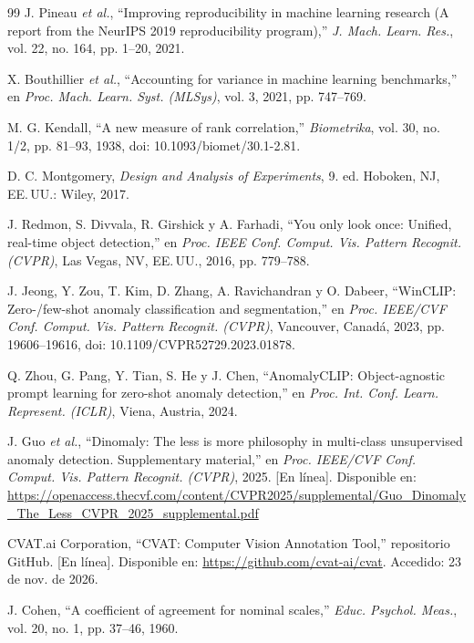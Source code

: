 \documentclass[12pt,oneside]{report}
\begin{document}
\begin{thebibliography}{99}
 J. Pineau \textit{et al.}, ``Improving reproducibility in machine learning research (A report from the NeurIPS 2019 reproducibility program),'' \textit{J. Mach. Learn. Res.}, vol. 22, no. 164, pp. 1--20, 2021.

 X. Bouthillier \textit{et al.}, ``Accounting for variance in machine learning benchmarks,'' en \textit{Proc. Mach. Learn. Syst. (MLSys)}, vol. 3, 2021, pp. 747--769.

 M. G. Kendall, ``A new measure of rank correlation,'' \textit{Biometrika}, vol. 30, no. 1/2, pp. 81--93, 1938, doi: 10.1093/biomet/30.1-2.81.

 D. C. Montgomery, \textit{Design and Analysis of Experiments}, 9.\textordfeminine{} ed. Hoboken, NJ, EE.\,UU.: Wiley, 2017.

 J. Redmon, S. Divvala, R. Girshick y A. Farhadi, ``You only look once: Unified, real-time object detection,'' en \textit{Proc. IEEE Conf. Comput. Vis. Pattern Recognit. (CVPR)}, Las Vegas, NV, EE.\,UU., 2016, pp. 779--788.

 J. Jeong, Y. Zou, T. Kim, D. Zhang, A. Ravichandran y O. Dabeer, ``WinCLIP: Zero-/few-shot anomaly classification and segmentation,'' en \textit{Proc. IEEE/CVF Conf. Comput. Vis. Pattern Recognit. (CVPR)}, Vancouver, Canadá, 2023, pp. 19606--19616, doi: 10.1109/CVPR52729.2023.01878.

 Q. Zhou, G. Pang, Y. Tian, S. He y J. Chen, ``AnomalyCLIP: Object-agnostic prompt learning for zero-shot anomaly detection,'' en \textit{Proc. Int. Conf. Learn. Represent. (ICLR)}, Viena, Austria, 2024.

 J. Guo \textit{et al.}, ``Dinomaly: The less is more philosophy in multi-class unsupervised anomaly detection. Supplementary material,'' en \textit{Proc. IEEE/CVF Conf. Comput. Vis. Pattern Recognit. (CVPR)}, 2025. [En línea]. Disponible en: \url{https://openaccess.thecvf.com/content/CVPR2025/supplemental/Guo_Dinomaly_The_Less_CVPR_2025_supplemental.pdf}

 CVAT.ai Corporation, ``CVAT: Computer Vision Annotation Tool,'' repositorio GitHub. [En línea]. Disponible en: \url{https://github.com/cvat-ai/cvat}. Accedido: 23 de nov. de 2026.

 J. Cohen, ``A coefficient of agreement for nominal scales,'' \textit{Educ. Psychol. Meas.}, vol. 20, no. 1, pp. 37--46, 1960.


\end{thebibliography}
\end{document}
